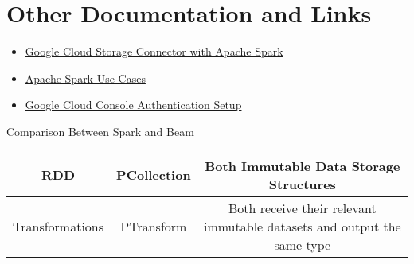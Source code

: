 \documentclass[english]{article}
\begin{document}
\section{Other Documentation and Links}
\begin{itemize}
\item \href{https://cloud.google.com/dataproc/docs/tutorials/gcs-connector-spark-tutorial}{Google Cloud Storage Connector with Apache Spark}
\item \href{https://www.qubole.com/blog/apache-spark-use-cases/}{Apache Spark Use Cases}
\item \href{https://cloud.google.com/docs/authentication/getting-started}{Google Cloud Console Authentication Setup}
\end{itemize}
Comparison Between Spark and Beam
\begin{center}
\begin{tabular}{|c|c|c|}
\hline
RDD & PCollection & Both Immutable Data Storage Structures \\ \hline
Transformations & PTransform & Both receive their relevant immutable datasets and output the same type
\end{tabular}
\end{center}
\end{document}
